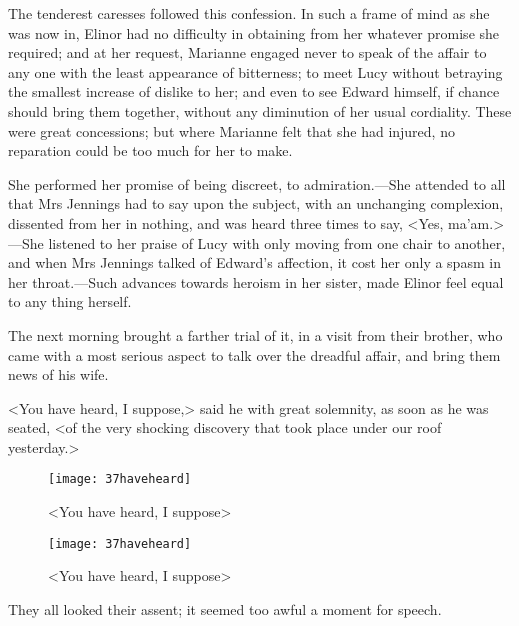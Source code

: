The tenderest caresses followed this confession. In such a frame of mind as she was now in, Elinor had no difficulty in obtaining from her whatever promise she required; and at her request, Marianne engaged never to speak of the affair to any one with the least appearance of bitterness; to meet Lucy without betraying the smallest increase of dislike to her; and even to see Edward himself, if chance should bring them together, without any diminution of her usual cordiality. These were great concessions; but where Marianne felt that she had injured, no reparation could be too much for her to make.

She performed her promise of being discreet, to admiration.—She attended to all that Mrs Jennings had to say upon the subject, with an unchanging complexion, dissented from her in nothing, and was heard three times to say, <Yes, ma'am.>—She listened to her praise of Lucy with only moving from one chair to another, and when Mrs Jennings talked of Edward's affection, it cost her only a spasm in her throat.—Such advances towards heroism in her sister, made Elinor feel equal to any thing herself.

The next morning brought a farther trial of it, in a visit from their brother, who came with a most serious aspect to talk over the dreadful affair, and bring them news of his wife.

<You have heard, I suppose,> said he with great solemnity, as soon as he was seated, <of the very shocking discovery that took place under our roof yesterday.>

\begin{a4}
	\begin{figure}[tbph]
		\centering
		\texttt{[image: 37haveheard]}
		\caption{<You have heard, I suppose>}
	\end{figure}
\end{a4}

\begin{letter}
	\begin{figure}[tbph]
		\centering
		\texttt{[image: 37haveheard]}
		\caption{<You have heard, I suppose>}
	\end{figure}
\end{letter}

They all looked their assent; it seemed too awful a moment for speech.

